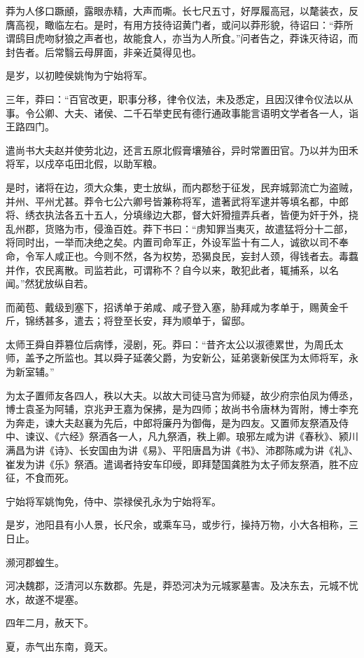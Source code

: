 \documentclass[]{article}
\begin{document}
莽为人侈口蹶顄，露眼赤精，大声而嘶。长七尺五寸，好厚履高冠，以氂装衣，反膺高视，瞰临左右。是时，有用方技待诏黄门者，或问以莽形貌，待诏曰：``莽所谓鸱目虎吻豺狼之声者也，故能食人，亦当为人所食。''问者告之，莽诛灭待诏，而封告者。后常翳云母屏面，非亲近莫得见也。

是岁，以初睦侯姚恂为宁始将军。

三年，莽曰：``百官改更，职事分移，律令仪法，未及悉定，且因汉律令仪法以从事。令公卿、大夫、诸侯、二千石举吏民有德行通政事能言语明文学者各一人，诣王路四门。

遣尚书大夫赵并使劳北边，还言五原北假膏壤殖谷，异时常置田官。乃以并为田禾将军，以戍卒屯田北假，以助军粮。

是时，诸将在边，须大众集，吏士放纵，而内郡愁于征发，民弃城郭流亡为盗贼，并州、平州尤甚。莽令七公六卿号皆兼称将军，遣著武将军逮并等填名都，中郎将、绣衣执法各五十五人，分填缘边大郡，督大奸猾擅弄兵者，皆便为奸于外，挠乱州郡，货赂为市，侵渔百姓。莽下书曰：``虏知罪当夷灭，故遣猛将分十二部，将同时出，一举而决绝之矣。内置司命军正，外设军监十有二人，诚欲以司不奉命，令军人咸正也。今则不然，各为权势，恐猲良民，妄封人颈，得钱者去。毒蠚并作，农民离散。司监若此，可谓称不？自今以来，敢犯此者，辄捕系，以名闻。''然犹放纵自若。

而蔺苞、戴级到塞下，招诱单于弟咸、咸子登入塞，胁拜咸为孝单于，赐黄金千斤，锦绣甚多，遣去；将登至长安，拜为顺单于，留邸。

太师王舜自莽篡位后病悸，浸剧，死。莽曰：``昔齐太公以淑德累世，为周氏太师，盖予之所监也。其以舜子延袭父爵，为安新公，延弟褒新侯匡为太师将军，永为新室辅。''

为太子置师友各四人，秩以大夫。以故大司徒马宫为师疑，故少府宗伯凤为傅丞，博士袁圣为阿辅，京兆尹王嘉为保拂，是为四师；故尚书令唐林为胥附，博士李充为奔走，谏大夫赵襄为先后，中郎将廉丹为御侮，是为四友。又置师友祭酒及侍中、谏议、《六经》祭酒各一人，凡九祭酒，秩上卿。琅邪左咸为讲《春秋》、颍川满昌为讲《诗》、长安国由为讲《易》、平阳唐昌为讲《书》、沛郡陈咸为讲《礼》、崔发为讲《乐》祭酒。遣谒者持安车印绶，即拜楚国龚胜为太子师友祭酒，胜不应征，不食而死。

宁始将军姚恂免，侍中、崇禄侯孔永为宁始将军。

是岁，池阳县有小人景，长尺余，或乘车马，或步行，操持万物，小大各相称，三日止。

濒河郡蝗生。

河决魏郡，泛清河以东数郡。先是，莽恐河决为元城冢墓害。及决东去，元城不忧水，故遂不堤塞。

四年二月，赦天下。

夏，赤气出东南，竟天。
\end{document}
